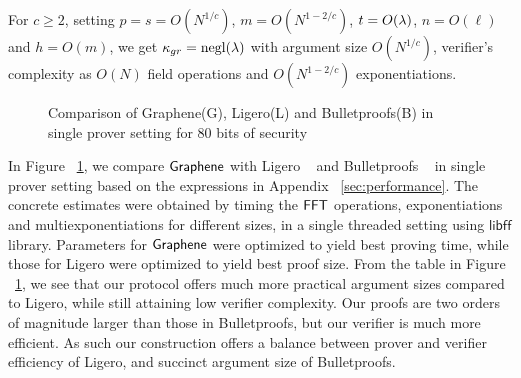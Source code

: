 For $c\geq 2$, setting $p=s=O(N^{1/c})$, $m=O(N^{1-2/c})$, $t=O(\lambda)$,
$n=O(\ell)$ and $h=O(m)$, we get $\kappa_{gr}=\mathrm{negl}(\lambda)$ with argument size
$O(N^{1/c})$, verifier's complexity as $O(N)$ field operations and
$O(N^{1-2/c})$ exponentiations. 

\begin{figure}[!]
\centering
{}
\caption{Comparison of Graphene(G), Ligero(L) and Bulletproofs(B) in single
prover setting for 80 bits of security}
\label{fig:standalonecompare}
\end{figure}


In Figure ~\ref{fig:standalonecompare}, we compare
$\textsf{Graphene}$ with Ligero ~\cite{ligero} and Bulletproofs ~\cite{bulletproofs} in
single prover setting based on the expressions in Appendix
~\ref{sec:performance}. The concrete estimates were obtained by timing the $\mathsf{FFT}$
operations, exponentiations and multiexponentiations for different sizes, in a
single threaded setting using $\mathsf{libff}$ library. Parameters for $\textsf{Graphene}$ were optimized to yield best
proving time, while those for Ligero were optimized to yield best proof size.
From the table in Figure ~\ref{fig:standalonecompare}, we see that our protocol offers much more practical argument
sizes compared to Ligero, while still attaining low verifier complexity. Our
proofs are two orders of magnitude larger than those in Bulletproofs, but our
verifier is much more efficient. 
As such our construction offers a balance
between prover and verifier efficiency of Ligero, and succinct argument size of
Bulletproofs. 

